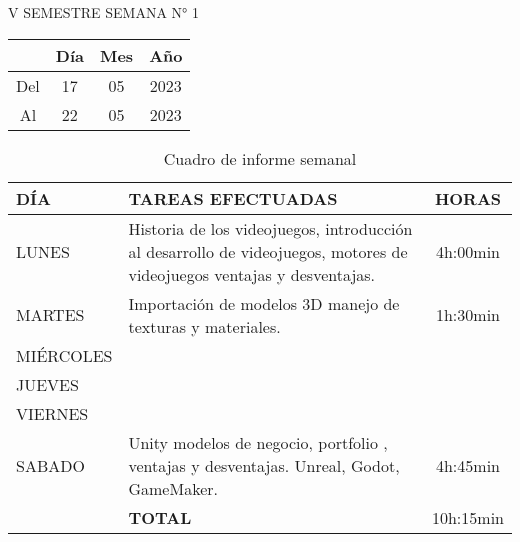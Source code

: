 \section*{}

V SEMESTRE SEMANA N° 1

\begin{table}[!ht]
  \begin{flushright}
    \begin{tabular}{| c | c | c | c |}
      \hline
      \rowcolor{gray!50}
              & Día & Mes & Año \\ \hline
      Del     &   17  &   05  & 2023    \\ \hline
      Al      &  22   &   05  &  2023   \\ \hline
    \end{tabular} 
  \end{flushright}
\end{table}

\vspace{1cm}
\begin{table}[!ht]
  \centering
  \begin{tabular}{| p{3cm} | p{10cm} | c |}
    \hline
    \rowcolor{gray!50}
    \textbf{DÍA} & \textbf{TAREAS EFECTUADAS} & \textbf{HORAS} \\ \hline
    LUNES &Historia de los videojuegos, introducción al desarrollo de videojuegos, motores de videojuegos ventajas y desventajas. & \large4h:00min\\ \hline
    MARTES &Importación de modelos 3D manejo de texturas y materiales. & \large1h:30min \\ \hline
    MIÉRCOLES & & \\ \hline 
    JUEVES & & \\ \hline
    VIERNES & & \\ \hline
    SABADO & Unity modelos de negocio, portfolio , ventajas y desventajas. Unreal, Godot, GameMaker.  & \large4h:45min\\ \hline
  & \textbf{TOTAL}& \large10h:15min\\ \hline
  \end{tabular}
  \caption{Cuadro de informe semanal}
  \label{tab:informe-semanal}
\end{table}

